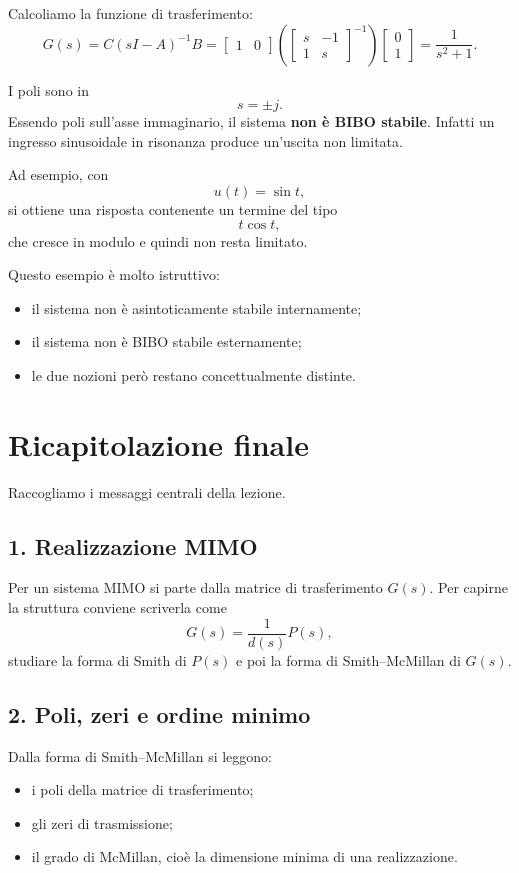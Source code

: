 Calcoliamo la funzione di trasferimento:
\[
G(s)=C(sI-A)^{-1}B
=
\begin{bmatrix}
1 & 0
\end{bmatrix}
\left(
\begin{bmatrix}
s & -1\\
1 & s
\end{bmatrix}^{-1}
\right)
\begin{bmatrix}
0\\
1
\end{bmatrix}
=
\frac{1}{s^2+1}.
\]

I poli sono in
\[
s=\pm j.
\]
Essendo poli sull'asse immaginario, il sistema \textbf{non è BIBO stabile}. Infatti un ingresso sinusoidale in risonanza produce un'uscita non limitata.

Ad esempio, con
\[
u(t)=\sin t,
\]
si ottiene una risposta contenente un termine del tipo
\[
t\cos t,
\]
che cresce in modulo e quindi non resta limitato.

\medskip

\noindent
Questo esempio è molto istruttivo:
\begin{itemize}
    \item il sistema non è asintoticamente stabile internamente;
    \item il sistema non è BIBO stabile esternamente;
    \item le due nozioni però restano concettualmente distinte.
\end{itemize}

\bigskip

\section{Ricapitolazione finale}

Raccogliamo i messaggi centrali della lezione.

\subsection*{1. Realizzazione MIMO}
Per un sistema MIMO si parte dalla matrice di trasferimento \(G(s)\). Per capirne la struttura conviene scriverla come
\[
G(s)=\frac{1}{d(s)}P(s),
\]
studiare la forma di Smith di \(P(s)\) e poi la forma di Smith--McMillan di \(G(s)\).

\subsection*{2. Poli, zeri e ordine minimo}
Dalla forma di Smith--McMillan si leggono:
\begin{itemize}
    \item i poli della matrice di trasferimento;
    \item gli zeri di trasmissione;
    \item il grado di McMillan, cioè la dimensione minima di una realizzazione.
\end{itemize}

